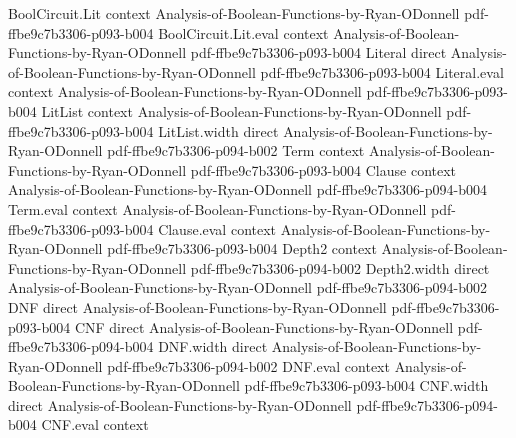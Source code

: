 \begin{lemma}
\leanok
{}
\proofstep
  {BoolCircuit.Lit}
  {context}
  {Analysis-of-Boolean-Functions-by-Ryan-ODonnell}
  {pdf-ffbe9c7b3306-p093-b004}
\proofstep
  {BoolCircuit.Lit.eval}
  {context}
  {Analysis-of-Boolean-Functions-by-Ryan-ODonnell}
  {pdf-ffbe9c7b3306-p093-b004}
\proofstep
  {Literal}
  {direct}
  {Analysis-of-Boolean-Functions-by-Ryan-ODonnell}
  {pdf-ffbe9c7b3306-p093-b004}
\proofstep
  {Literal.eval}
  {context}
  {Analysis-of-Boolean-Functions-by-Ryan-ODonnell}
  {pdf-ffbe9c7b3306-p093-b004}
\proofstep
  {LitList}
  {context}
  {Analysis-of-Boolean-Functions-by-Ryan-ODonnell}
  {pdf-ffbe9c7b3306-p093-b004}
\proofstep
  {LitList.width}
  {direct}
  {Analysis-of-Boolean-Functions-by-Ryan-ODonnell}
  {pdf-ffbe9c7b3306-p094-b002}
\proofstep
  {Term}
  {context}
  {Analysis-of-Boolean-Functions-by-Ryan-ODonnell}
  {pdf-ffbe9c7b3306-p093-b004}
\proofstep
  {Clause}
  {context}
  {Analysis-of-Boolean-Functions-by-Ryan-ODonnell}
  {pdf-ffbe9c7b3306-p094-b004}
\proofstep
  {Term.eval}
  {context}
  {Analysis-of-Boolean-Functions-by-Ryan-ODonnell}
  {pdf-ffbe9c7b3306-p093-b004}
\proofstep
  {Clause.eval}
  {context}
  {Analysis-of-Boolean-Functions-by-Ryan-ODonnell}
  {pdf-ffbe9c7b3306-p093-b004}
\proofstep
  {Depth2}
  {context}
  {Analysis-of-Boolean-Functions-by-Ryan-ODonnell}
  {pdf-ffbe9c7b3306-p094-b002}
\proofstep
  {Depth2.width}
  {direct}
  {Analysis-of-Boolean-Functions-by-Ryan-ODonnell}
  {pdf-ffbe9c7b3306-p094-b002}
\proofstep
  {DNF}
  {direct}
  {Analysis-of-Boolean-Functions-by-Ryan-ODonnell}
  {pdf-ffbe9c7b3306-p093-b004}
\proofstep
  {CNF}
  {direct}
  {Analysis-of-Boolean-Functions-by-Ryan-ODonnell}
  {pdf-ffbe9c7b3306-p094-b004}
\proofstep
  {DNF.width}
  {direct}
  {Analysis-of-Boolean-Functions-by-Ryan-ODonnell}
  {pdf-ffbe9c7b3306-p094-b002}
\proofstep
  {DNF.eval}
  {context}
  {Analysis-of-Boolean-Functions-by-Ryan-ODonnell}
  {pdf-ffbe9c7b3306-p093-b004}
\proofstep
  {CNF.width}
  {direct}
  {Analysis-of-Boolean-Functions-by-Ryan-ODonnell}
  {pdf-ffbe9c7b3306-p094-b004}
\proofstep
  {CNF.eval}
  {context}

\end{lemma}
